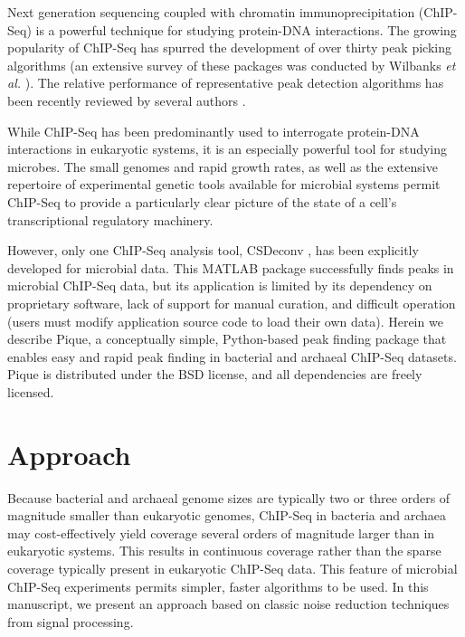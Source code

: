 \begin{refsection}
Next generation sequencing coupled with chromatin
immuno\-pre\-cipi\-tation (ChIP-Seq) is a powerful technique for
studying protein-DNA interactions. The growing popularity of ChIP-Seq
has spurred the development of over thirty peak picking algorithms (an
extensive survey of these packages was conducted by Wilbanks {\em et
  al.} \cite{wilbanks}). The relative performance of representative
peak detection algorithms has been recently reviewed by several
authors \cite{Pepke, Laajala_review, too_many_peak_callers,
  peakranger, peak_benchmark}.

While ChIP-Seq has been predominantly used to interrogate protein-DNA
interactions in eukaryotic systems, it is an especially powerful tool
for studying microbes. The small genomes and rapid growth rates, as
well as the extensive repertoire of experimental genetic tools
available for microbial systems permit ChIP-Seq to provide a
particularly clear picture of the state of a cell's transcriptional
regulatory machinery.

However, only one ChIP-Seq analysis tool, CSDeconv \cite{CSDeconv},
has been explicitly developed for microbial data.  This MATLAB package
successfully finds peaks in microbial ChIP-Seq data, but its
application is limited by its dependency on proprietary software, lack
of support for manual curation, and difficult operation (users must
modify application source code to load their own
data). \cite{wilbanks} Herein we describe Pique, a conceptually
simple, Python-based peak finding package that enables easy and rapid
peak finding in bacterial and archaeal ChIP-Seq datasets. Pique is
distributed under the BSD license, and all dependencies are freely
licensed.

\section{Approach}

\noindent Because bacterial and archaeal genome sizes are typically
two or three orders of magnitude smaller than eukaryotic genomes,
ChIP-Seq in bacteria and archaea may cost-effectively yield coverage
several orders of magnitude larger than in eukaryotic systems. This
results in continuous coverage rather than the sparse coverage
typically present in eukaryotic ChIP-Seq data.  This feature of
microbial ChIP-Seq experiments permits simpler, faster algorithms to
be used. In this manuscript, we present an approach based on classic
noise reduction techniques from signal processing.


\end{refsection}
